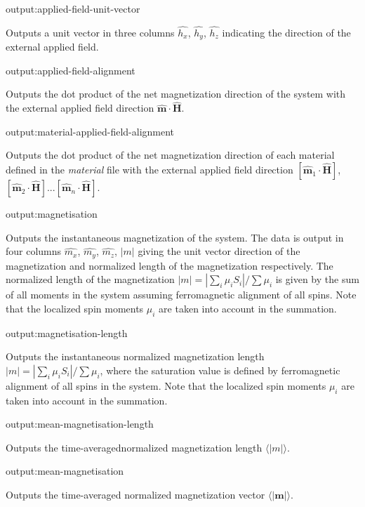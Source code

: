 {\zicf output:applied-field-unit-vector} Outputs a unit vector in three columns $\hat{h_x}$, $\hat{h_y}$, $\hat{h_z}$ indicating the direction of the external applied field.

{\zicf output:applied-field-alignment} Outputs the dot product of the net magnetization direction of the system with the external applied field direction $\hat{\mathbf{m}} \cdot \hat{\mathbf{H}}$.

{\zicf output:material-applied-field-alignment} Outputs the dot product of the net magnetization direction of each material defined in the \textit{material} file with the external applied field direction $\left[\hat{\mathbf{m}}_1 \cdot \hat{\mathbf{H}}\right]$, $\left[\hat{\mathbf{m}}_2 \cdot \hat{\mathbf{H}}\right]$...$\left[\hat{\mathbf{m}}_n \cdot \hat{\mathbf{H}}\right]$.

{\zicf output:magnetisation} Outputs the instantaneous magnetization of the system. The data is output in four columns $\hat{m_x}$, $\hat{m_y}$, $\hat{m_z}$, $|m|$ giving the unit vector direction of the magnetization and
normalized length of the magnetization respectively. The normalized length of the magnetization $|m| = |\sum_i \mu_i S_i| / \sum \mu_i$ is given by the sum of all moments in the system assuming ferromagnetic alignment of all spins. Note that the localized spin moments $\mu_i$ are taken into account in the summation.

{\zicf output:magnetisation-length} Outputs the instantaneous normalized magnetization length $|m| = |\sum_i \mu_i S_i| / \sum \mu_i$, where the saturation value is defined by ferromagnetic alignment of all spins in the system. Note that the localized spin moments $\mu_i$ are taken into account in the summation.

{\zicf output:mean-magnetisation-length} Outputs the time-averaged\newline normalized magnetization length $\langle|m|\rangle$.

{\zicf output:mean-magnetisation} Outputs the time-averaged normalized magnetization vector $\langle|\mathbf{m}|\rangle$.

